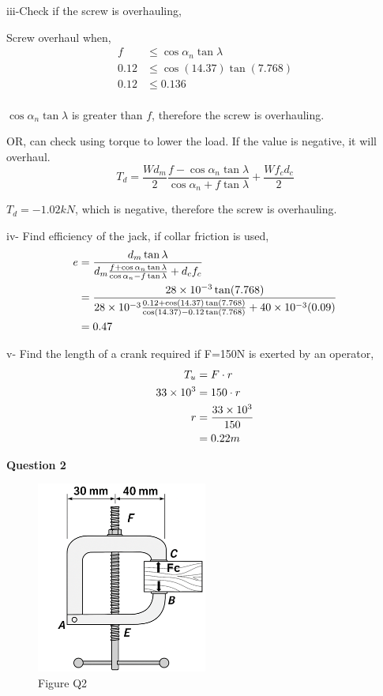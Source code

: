 \documentclass[a4paper, fleqn]{article}
\providecommand{\sci}[1]{\protect\ensuremath{\times 10^{\StrSubstitute[0]{#1}{e}{}}}}
\begin{document}
iii-Check if the screw is overhauling,

Screw overhaul when,
\begin{equation*}
    \begin{aligned}
    f &\le \cos \alpha_n \tan \lambda \\
    0.12 &\le \cos(14.37) \tan(7.768)\\
    0.12 &\le 0.136\\
    \end{aligned}
\end{equation*}

$\cos \alpha_n \tan \lambda$ is greater than $f$, therefore the screw is overhauling.

OR, can check using torque to lower the load. If the value is negative, it will overhaul.
$$T_d = \frac{Wd_m}{2} \frac{f-\cos\alpha_n \tan\lambda}{\cos\alpha_n + f\tan\lambda} + \frac{Wf_c d_c}{2}$$

$T_d=-1.02kN$, which is negative, therefore the screw is overhauling.

iv- Find efficiency of the jack, if collar friction is used,
\begin{equation*}
    \begin{aligned}
    e &=\frac{d_m \tan \lambda}{d_m \frac{f+\cos\alpha_n \tan\lambda}{\cos\alpha_n - f\tan\lambda}+d_c f_c} \\
    &=\frac{28\sci{e-3} \tan(7.768)}{28\sci{e-3} \frac{0.12+\cos(14.37) \tan(7.768)}{\cos(14.37) - 0.12\tan(7.768)}+40\sci{e-3} (0.09)} \\
    &=0.47
    \end{aligned}
\end{equation*}

v- Find the length of a crank required if F=150N is exerted by an operator,
\begin{equation*}
    \begin{aligned}
    T_u &= F \cdot r\\
    33\sci{e3} &= 150 \cdot r\\
    r &= \frac{33\sci{e3}}{150}\\
    &= 0.22 m
    \end{aligned}
\end{equation*}

\textbf{Question 2}

\begin{figure}[h]
    \centering
    \includegraphics[width=0.5\textwidth]{t2-q2.png}
    \caption{Figure Q2}
\end{figure}
\end{document}
